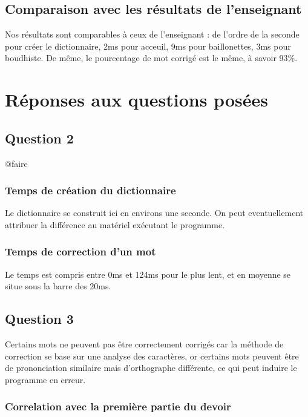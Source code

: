 \documentclass[french,12pt,a4]{report}
\begin{document}
\section{Comparaison avec les résultats de l'enseignant}

Nos résultats sont comparables à ceux de l'enseignant : de l'ordre de
la seconde pour créer le dictionnaire, 2ms pour acceuil, 9ms pour
baillonettes, 3ms pour boudhiste. De même, le pourcentage de mot
corrigé est le même, à savoir 93\%.
 

\chapter{Réponses aux questions posées}

\section{Question 2}

@faire

\subsection{Temps de création du dictionnaire}
Le dictionnaire se construit ici en environs une seconde. On peut
eventuellement attribuer la différence au matériel exécutant le programme.

\subsection{Temps de correction d'un mot}

Le temps est compris entre 0ms et 124ms pour le plus lent, et en
moyenne se situe sous la barre des 20ms.


\section{Question 3}

Certains mots ne peuvent pas être correctement corrigés car la méthode
de correction se base sur une analyse des caractères, or certains mots
peuvent être de prononciation similaire mais d'orthographe différente,
ce qui peut induire le programme en erreur.


\subsection{Correlation avec la première partie du devoir}
\end{document}
